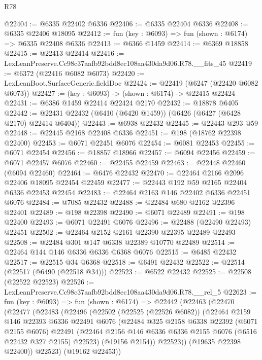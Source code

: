 \begin{lexlean}{R78}
\begin{coremodule}
@22404 := @6335 @22402 @6336
@22406 := @6335 @22404 @6336
@22408 := @6335 @22406 @18095
@22412 := fun (key : @6093) => fun (shown : @6174) => @6335 @22408 @6336
@22413 := @6366 @1459
@22414 := @6369 @18858
@22415 := @22413 @22414
@22416 := LexLeanPreserve.Cc98c37aafb92bdd8ec108aa430da9d06.R78.__fits_45
@22419 := @6372 (@22416 @6082 @6073)
@22420 := LexLeanBoot.SurfaceGeneric.fieldDoc
@22424 := @22419 (@6247 (@22420 @6082 @6073))
@22427 := (key : @6093) -> (shown : @6174) -> @22415 @22424
@22431 := @6386 @1459 @22414 @22424 @2170
@22432 := @18878 @6405
@22442 := @22431 @22432 (@6410 (@6420 @1459)) (@6426 (@6427 (@6428 @2170) @22414 @6404))
@22443 := @6938 @22432
@22445 := @22443 @293 @59
@22448 := @22445 @2168 @22408 @6336
@22451 := @198 (@18762 @22398 @22400)
@22453 := @6071 @22451 @6076
@22454 := @6081 @22453
@22455 := @6071 @22454
@22456 := @18857 @18966
@22457 := @6094 @22456
@22459 := @6071 @22457 @6076
@22460 := @22455 @22459
@22463 := @22448 @22460 (@6094 @22460)
@22464 := @6476 @22432
@22470 := @22464 @2166 @2096 @22406 @18095 @22454 @22459
@22477 := @22443 @192 @59 @2165 @22404 @6336 @22453 @22454
@22483 := @22464 @2163 @146 @22402 @6336 @22451 @6076
@22484 := @7085 @22432
@22488 := @22484 @680 @2162 @22396 @22401
@22489 := @198 @22398
@22490 := @6071 @22489
@22491 := @198 @22400
@22493 := @6071 @22491 @6076
@22496 := @22488 (@22490 @22493) @22451
@22502 := @22464 @2152 @2161 @22390 @22395 @22489 @22493
@22508 := @22484 @301 @147 @6338 @22389 @10770 @22489
@22514 := @22464 @144 @146 @6336 @6336 @6368 @6076
@22515 := @6485 @22432
@22517 := @22515 @34 @6368
@22518 := @6491 @22432
@22522 := @22514 (@22517 (@6490 (@22518 @34)))
@22523 := @6522 @22432
@22525 := @22508 (@22522 @22523)
@22526 := LexLeanPreserve.Cc98c37aafb92bdd8ec108aa430da9d06.R78.__rel_5
@22623 := fun (key : @6093) =>
  fun (shown : @6174) =>
  @22442
    (@22463
      (@22470
        (@22477
          (@22483
            (@22496
              (@22502
                (@22525 (@22526 @6082))
                (@22464
                  @2159
                  @146
                  @22393
                  @6336
                  @22491
                  @6076
                  (@22484
                    @325
                    @2158
                    @6338
                    @22392
                    (@6071 @2155 @6076)
                    @22491
                    (@22464 @2156 @146 @6336 @6336 @2155 @6076 (@6516 @22432 @327 @2155) @22523)
                    (@19156 @2154))
                  @22523))
              (@19635 @22398 @22400))
            @22523)
          (@19162 @22453))

\end{coremodule}
\end{lexlean}

